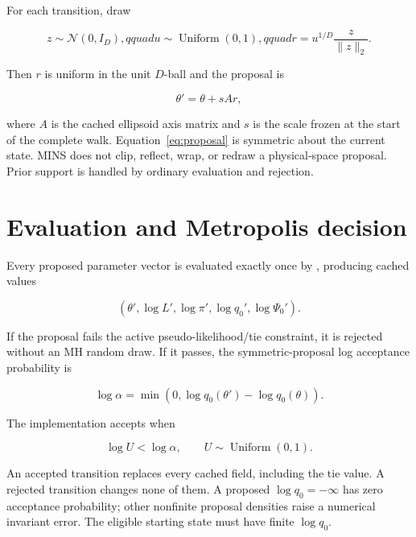 \documentclass[11pt,a4paper]{article}
\newcommand{\MINS}{\textsc{MINS}}
\newcommand{\code}[1]{\texttt{\detokenize{#1}}}
\begin{document}
For each transition, draw

\begin{equation}
  z\sim\mathcal{N}(0,I_D),qquad
  u\sim\operatorname{Uniform}(0,1),qquad
  r=u^{1/D}\frac{z}{\lVert z\rVert_2}.
\end{equation}

Then \(r\) is uniform in the unit \(D\)-ball and the proposal is

\begin{equation}
  \theta'=\theta+sAr,
  \label{eq:proposal}
\end{equation}

where \(A\) is the cached ellipsoid axis matrix and \(s\) is the scale frozen
at the start of the complete walk.  Equation~\eqref{eq:proposal} is symmetric
about the current state.  \MINS{} does not clip, reflect, wrap, or redraw a
physical-space proposal.  Prior support is handled by ordinary evaluation and
rejection.

\section{Evaluation and Metropolis decision}

Every proposed parameter vector is evaluated exactly once by
\code{BatchEvaluator}, producing cached values

\begin{equation}
  \left(\theta',\log L',\log\pi',\log q_0',\log\Psi_0'\right).
\end{equation}

If the proposal fails the active pseudo-likelihood/tie constraint, it is
rejected without an MH random draw.  If it passes, the symmetric-proposal log
acceptance probability is

\begin{equation}
  \log\alpha
  =\min\left(0,\log q_0(\theta')-\log q_0(\theta)\right).
  \label{eq:mh}
\end{equation}

The implementation accepts when

\begin{equation}
  \log U < \log\alpha,
  \qquad U\sim\operatorname{Uniform}(0,1).
\end{equation}

An accepted transition replaces every cached field, including the tie value.
A rejected transition changes none of them.  A proposed \(\log q_0=-\infty\)
has zero acceptance probability; other nonfinite proposal densities raise a
numerical invariant error.  The eligible starting state must have finite
\(\log q_0\).
\end{document}
